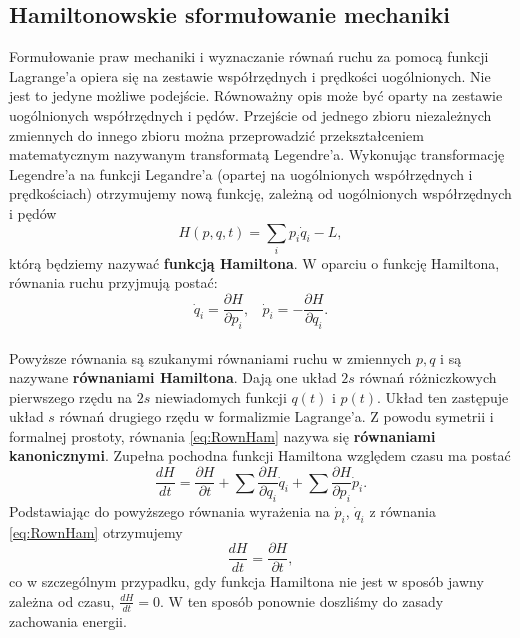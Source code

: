 \documentclass[12pt,a4paper,openright]{report} %
\begin{document}
\subsection{Hamiltonowskie sformułowanie mechaniki}
Formułowanie praw mechaniki i wyznaczanie równań ruchu za pomocą funkcji Lagrange'a opiera się na zestawie współrzędnych i prędkości uogólnionych. Nie jest to jedyne możliwe podejście. Równoważny opis może być oparty na zestawie uogólnionych współrzędnych i pędów. Przejście od jednego zbioru niezależnych zmiennych do innego zbioru można przeprowadzić przekształceniem matematycznym nazywanym transformatą Legendre'a. Wykonując transformację Legendre'a na funkcji Legandre'a (opartej na uogólnionych współrzędnych i prędkościach) otrzymujemy nową funkcję, zależną od uogólnionych współrzędnych i pędów
\begin{equation}
H(p,q,t)=\sum \limits_{i} p_i \dot{q}_i - L,
\end{equation}
którą będziemy nazywać \textbf{funkcją Hamiltona}. W oparciu o funkcję Hamiltona, równania ruchu przyjmują postać:
\begin{equation}
\dot{q}_i = \frac{\partial H}{\partial p_i}, ~~~~ \dot{p}_i=-\frac{\partial H}{\partial q_i}.
\label{eq:RownHam}
\end{equation}
\\
Powyższe równania są szukanymi równaniami ruchu w zmiennych $p, q$ i są nazywane \textbf{równaniami Hamiltona}. Dają one układ $2s$ równań różniczkowych pierwszego rzędu na $2s$ niewiadomych funkcji $q(t)$ i $p(t)$. Układ ten zastępuje układ $s$ równań drugiego rzędu w formalizmie Lagrange'a. Z powodu symetrii i formalnej prostoty, równania \ref{eq:RownHam} nazywa się \textbf{równaniami kanonicznymi}.
Zupełna pochodna funkcji Hamiltona względem czasu ma postać
\begin{equation}
\frac{dH}{dt}=\frac{\partial H}{\partial t} + \sum \frac{\partial H}{\partial q_i} \dot{q}_i + \sum \frac{\partial H}{\partial p_i} \dot{p}_i .
\end{equation}
Podstawiając do powyższego równania wyrażenia na $\dot{p}_i$, $\dot{q}_i$ z równania \ref{eq:RownHam} otrzymujemy
\begin{equation}
\frac{d H}{dt} = \frac{\partial H}{ \partial t},
\end{equation}
co w szczególnym przypadku, gdy funkcja Hamiltona nie jest w sposób jawny zależna od czasu, $\frac{dH}{dt}=0$. W ten sposób ponownie doszliśmy do zasady zachowania energii.
\\
\\
\end{document}
